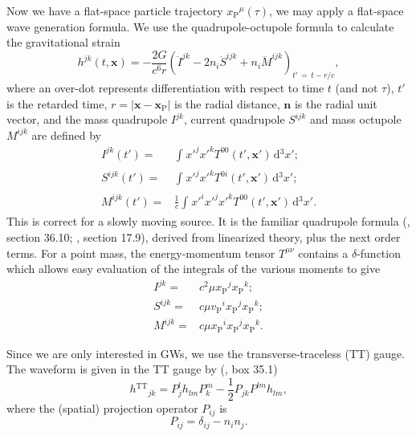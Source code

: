 \documentclass[useAMS,usedcolumn,usegraphicx,usenatbib]{mn2e}
\newcommand{\sub}[1]{\ensuremath{_\mathrm{#1}}}
\newcommand{\super}[1]{\ensuremath{^\mathrm{#1}}}
\newcommand{\dd}{\ensuremath{\mathrm{d}}}
\newcommand{\intd}[4]{\ensuremath{\int_{#1}^{#2}{#3}\,\dd{#4}}}
\newcommand{\recip}[1]{\ensuremath{\frac{1}{#1}}}
\begin{document}
Now we have a flat-space particle trajectory $x\sub{P}^\mu(\tau)$, we may apply a flat-space wave generation formula. We use the quadrupole-octupole formula to calculate the gravitational strain \citep{Bekenstein1973, Press1977, Yunes2008}
\begin{equation}
h^{jk}(t, \boldsymbol{x}) = -\frac{2G}{c^6r}\left(\ddot{I}^{jk} - 2n_i\ddot{S}^{ijk} + n_i\dddot{M}^{ijk}\right)_{t'\, =\, t - r/c},
\label{eq:octupole}
\end{equation}
where an over-dot represents differentiation with respect to time $t$ (and not $\tau$), $t'$ is the retarded time, $r = \left|\boldsymbol{x} - \boldsymbol{x}\sub{P}\right|$ is the radial distance, $\boldsymbol{n}$ is the radial unit vector, and the mass quadrupole ${I}^{jk}$, current quadrupole ${S}^{ijk}$ and mass octupole ${M}^{ijk}$ are defined by
\begin{align}
{I}^{jk}\left(t'\right) = {} & \intd{}{}{{x'}^j{x'}^kT^{00}\left(t', \boldsymbol{x'}\right) }{^3x'};\\
{S}^{ijk}\left(t'\right) = {} & \intd{}{}{{x'}^j{x'}^kT^{0i}\left(t', \boldsymbol{x'}\right)}{^3x'};\\
{M}^{ijk}\left(t'\right)  = {} & \recip{c}\intd{}{}{{x'}^i{x'}^j{x'}^kT^{00}\left(t', \boldsymbol{x'}\right)}{^3x'}.
\end{align}
This is correct for a slowly moving source. It is the familiar quadrupole formula (\citealt*{Misner1973}, section 36.10; \citealt{Hobson2006}, section 17.9), derived from linearized theory, plus the next order terms. For a point mass, the energy-momentum tensor $T^{\mu\nu}$ contains a $\delta$-function which allows easy evaluation of the integrals of the various moments to give
\begin{align}
{I}^{jk} = {} & c^2\mu x\sub{P}^jx\sub{P}^k;\\
{S}^{ijk} = {} & c\mu v\sub{P}^ix\sub{P}^jx\sub{P}^k;\\
{M}^{ijk} = {} & c\mu x\sub{P}^ix\sub{P}^jx\sub{P}^k.
\end{align}

Since we are only interested in GWs, we use the transverse-traceless (TT) gauge. The waveform is given in the TT gauge by (\citealt{Misner1973}, box 35.1)
\begin{equation}
h\super{TT}_{jk} = P^l_jh_{lm}P^m_k - \recip{2}P_{jk}P^{lm}h_{lm},
\end{equation}
where the (spatial) projection operator $P_{ij}$ is
\begin{equation}
P_{ij} = \delta_{ij} - n_in_j.
\end{equation}
\end{document}
